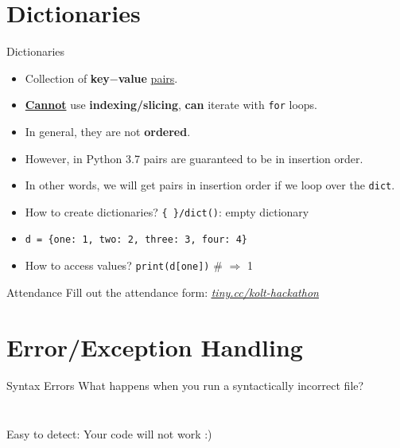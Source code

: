     \section{Dictionaries}
    \begin{frame}{Dictionaries}
        \Large
        \begin{itemize}
            \item Collection of \textbf{key$-$value} \underline{pairs}.
            \pause
            \item \underline{\textbf{Cannot}} use \textbf{indexing/slicing}, \textbf{can} iterate with \texttt{for} loops. 
            \pause
            \item In general, they are not \textbf{ordered}. 
            \pause
            \item However, in Python 3.7 pairs are guaranteed to be in insertion order.
            \pause
            \item In other words, we will get pairs in insertion order if we loop over the \texttt{dict}.
            \pause
            \item How to create dictionaries?
            \pause
             \texttt{\{\ \}/dict()}: empty dictionary
            \pause
            \item \texttt{d = \{\textquotesingle one\textquotesingle : 1, \textquotesingle two\textquotesingle : 2, \textquotesingle three\textquotesingle : 3, \textquotesingle four\textquotesingle : 4\}}
            \pause
            \item How to access values? 
            \pause
             \texttt{print(d[\textquotesingle one\textquotesingle ])} \# $\Rightarrow$ 1
        \end{itemize}
    \end{frame}
    
    \begin{frame}{Attendance}
        \Huge
        Fill out the attendance form: \href{http://tiny.cc/kolt-hackathon}{\underline{\textit{tiny.cc/kolt-hackathon}}}
    \end{frame}

    \section{Error/Exception Handling}
    \begin{frame}{Syntax Errors}
        \LARGE
        What happens when you run a syntactically incorrect file?
        \pause
        \inputminted[frame=single,framesep=2pt,firstline=1,lastline=3]{python3}{code-examples/syntax_error.py}
        \pause
        \inputminted[frame=single,framesep=2pt,firstline=5]{python3}{code-examples/syntax_error.py}
        Easy to detect: Your code will not work :)
    \end{frame}

